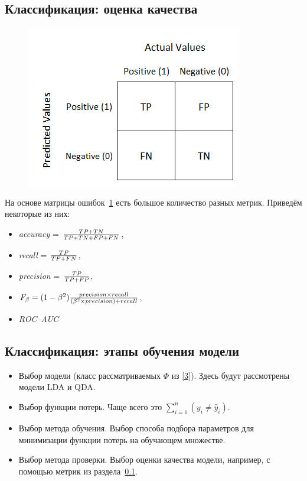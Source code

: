 \documentclass[11pt, oneside]{article}   	%
\begin{document}
		\subsection{Классификация: оценка качества}
		\label{metrics}
		\begin{figure}
			\includegraphics[width=0.7\linewidth]{imgs/conf_matrix}
			\label{conf_matrix}
			
		\end{figure}
	    На основе матрицы ошибок~\ref{conf_matrix} есть большое количество разных метрик. Приведём некоторые из них: 
	    \begin{itemize}
	    	\item\textit{accuracy} = ${TP + TN}\over{TP+TN+FP+FN}$, 
	    	\item\textit{recall} = ${TP}\over{TP+FN}$, 
	    	\item\textit{precision} = ${TP}\over{TP+FP}$, 
	    	\item $F_\beta = (1-\beta^2) {{precision \times recall}\over{(\beta^2 \times precision) + recall}}$, 
	    	\item\textit{ROC--AUC}
	    \end{itemize}


		\subsection{Классификация: этапы обучения модели}
		\begin{itemize}
			\item Выбор модели (класс рассматриваемых $\Phi$ из \ref{3}).
					 Здесь будут рассмотрены модели LDA и QDA. 
			\item Выбор функции потерь.
					 Чаще всего это $\sum_{i=1}^{n}(y_i \neq \widehat{y}_i)$.
			\item Выбор метода обучения.
			 		Выбор способа подбора параметров для минимизации функции потерь на обучающем множестве.
			\item Выбор метода проверки.
			 		Выбор оценки качества модели, например, с помощью метрик из раздела~\ref{metrics}.
		\end{itemize}
\end{document}
